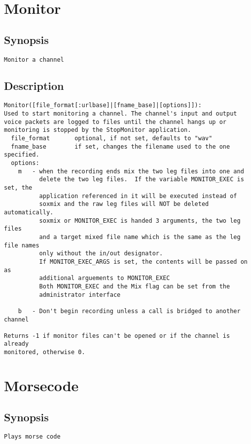 \section{Monitor}
\subsection{Synopsis}
\begin{verbatim}
Monitor a channel
\end{verbatim}
\subsection{Description}
\begin{verbatim}
Monitor([file_format[:urlbase]|[fname_base]|[options]]):
Used to start monitoring a channel. The channel's input and output
voice packets are logged to files until the channel hangs up or
monitoring is stopped by the StopMonitor application.
  file_format		optional, if not set, defaults to "wav"
  fname_base		if set, changes the filename used to the one specified.
  options:
    m   - when the recording ends mix the two leg files into one and
          delete the two leg files.  If the variable MONITOR_EXEC is set, the
          application referenced in it will be executed instead of
          soxmix and the raw leg files will NOT be deleted automatically.
          soxmix or MONITOR_EXEC is handed 3 arguments, the two leg files
          and a target mixed file name which is the same as the leg file names
          only without the in/out designator.
          If MONITOR_EXEC_ARGS is set, the contents will be passed on as
          additional arguements to MONITOR_EXEC
          Both MONITOR_EXEC and the Mix flag can be set from the
          administrator interface

    b   - Don't begin recording unless a call is bridged to another channel

Returns -1 if monitor files can't be opened or if the channel is already
monitored, otherwise 0.

\end{verbatim}


\section{Morsecode}
\subsection{Synopsis}
\begin{verbatim}
Plays morse code
\end{verbatim}
